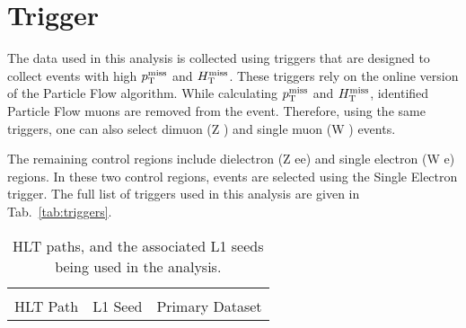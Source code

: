 \section{Trigger} 
\label{sec:trigger}

The data used in this analysis is collected using triggers that are designed to collect events with high $p_{\mathrm{T}}^{\mathrm{miss}}$ and $H_{\mathrm{T}}^{\mathrm{miss}}$. 
These triggers rely on the online version of the Particle Flow algorithm. While calculating $p_{\mathrm{T}}^{\mathrm{miss}}$ and $H_{\mathrm{T}}^{\mathrm{miss}}$, identified
Particle Flow muons are removed from the event. Therefore, using the same triggers, one can also select dimuon (Z \rightarrow \mu \mu) 
and single muon (W \rightarrow \mu \nu) events.

The remaining control regions include dielectron (Z \rightarrow ee) and single electron (W \rightarrow e\nu) regions. In these two control
regions, events are selected using the Single Electron trigger. The full list of triggers used in this analysis are given in 
Tab.~\ref{tab:triggers}.

\begin{table}[ht!]
    \centering
    \small
    \def\arraystretch{1.5}
    \caption{HLT paths, and the associated L1 seeds being used in the analysis.}
    \begin{tabular}{l l c}
        \hline
        \hline
                                &                                               \\
        HLT Path                & L1 Seed                   & Primary Dataset   \\
        
        
    \end{tabular}
    
\end{table}